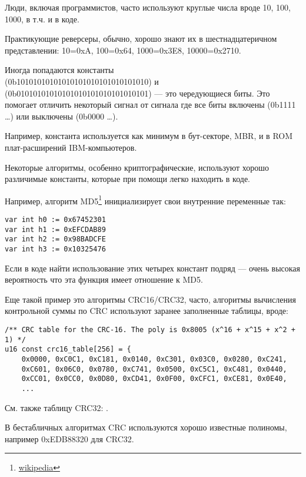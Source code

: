 
Люди, включая программистов, часто используют круглые числа вроде 10, 100, 1000, в т.ч. и в коде.

Практикующие реверсеры, обычно, хорошо знают их в шестнадцатеричном представлении:
10=0xA, 100=0x64, 1000=0x3E8, 10000=0x2710.

Иногда попадаются константы  \\
(0b10101010101010101010101010101010) и
 (0b01010101010101010101010101010101) --- это чередующиеся биты.
Это помогает отличить некоторый сигнал от сигнала где все биты включены (0b1111 \dots) или выключены (0b0000 \dots).

Например, константа  используется как минимум в бут-секторе, \ac{MBR}, 
и в \ac{ROM} плат-расширений IBM-компьютеров.

Некоторые алгоритмы, особенно криптографические, используют хорошо различимые константы, 
которые при помощи \IDA легко находить в коде.

\newcommand{\URLMD}{http://go.yurichev.com/17110}

Например, алгоритм MD5\footnote{\href{\URLMD}{wikipedia}} инициализирует свои внутренние переменные так:

\begin{verbatim}
var int h0 := 0x67452301
var int h1 := 0xEFCDAB89
var int h2 := 0x98BADCFE
var int h3 := 0x10325476
\end{verbatim}

Если в коде найти использование этих четырех констант подряд --- очень высокая вероятность что эта функция имеет отношение к MD5.

\par
Еще такой пример это алгоритмы CRC16/CRC32, часто, алгоритмы вычисления контрольной суммы по CRC 
используют заранее заполненные таблицы, вроде:

\begin{lstlisting}[caption=linux/lib/crc16.c,style=customc]
/** CRC table for the CRC-16. The poly is 0x8005 (x^16 + x^15 + x^2 + 1) */
u16 const crc16_table[256] = {
	0x0000, 0xC0C1, 0xC181, 0x0140, 0xC301, 0x03C0, 0x0280, 0xC241,
	0xC601, 0x06C0, 0x0780, 0xC741, 0x0500, 0xC5C1, 0xC481, 0x0440,
	0xCC01, 0x0CC0, 0x0D80, 0xCD41, 0x0F00, 0xCFC1, 0xCE81, 0x0E40,
	...
\end{lstlisting}

См. также таблицу CRC32: .

В бестабличных алгоритмах CRC используются хорошо известные полиномы, например 0xEDB88320 для CRC32.

